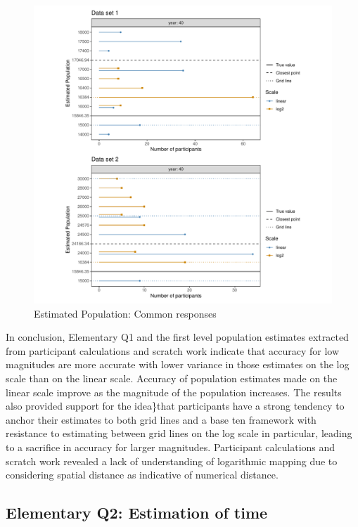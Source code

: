 \documentclass[print]{nuthesis}
\begin{document}
\begin{figure}[tbp]

{\centering \includegraphics[width=1\linewidth,]{thesis_files/figure-latex/common-population-estimates-1} 

}

\caption{Estimated Population: Common responses}\label{fig:common-population-estimates}
\end{figure}

In conclusion, Elementary Q1 and the first level population estimates extracted from participant calculations and scratch work indicate that accuracy for low magnitudes are more accurate with lower variance in those estimates on the log scale than on the linear scale.
Accuracy of population estimates made on the linear scale improve as the magnitude of the population increases.
The results also provided support for the idea\}that participants have a strong tendency to anchor their estimates to both grid lines and a base ten framework with resistance to estimating between grid lines on the log scale in particular, leading to a sacrifice in accuracy for larger magnitudes.
Participant calculations and scratch work revealed a lack of understanding of logarithmic mapping due to considering spatial distance as indicative of numerical distance.

\hypertarget{elementary-q2-estimation-of-time}{%
\subsection{Elementary Q2: Estimation of time}\label{elementary-q2-estimation-of-time}}
\end{document}
